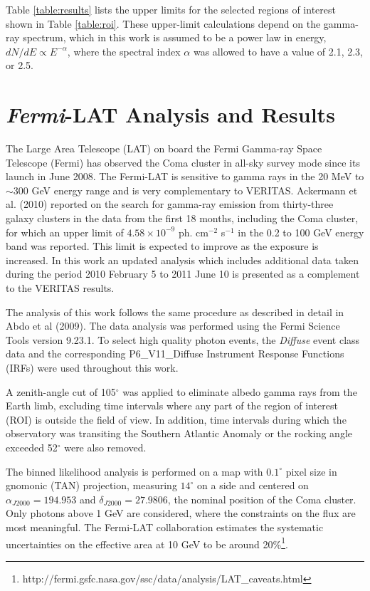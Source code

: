 \documentclass[12pt,manuscript]{aastex}
\def\Fermi{{\em Fermi}\xspace}
\begin{document}
Table \ref{table:results} lists the upper limits for the selected regions of interest shown in
Table \ref{table:roi}. These upper-limit calculations depend on the gamma-ray spectrum, which in
this work is assumed to be a power law in energy, $dN/dE\propto E^{-\alpha}$, where the spectral index
$\alpha$ was allowed to have a value of 2.1, 2.3, or 2.5.

%
%

\section{\Fermi-LAT Analysis and Results}
The Large Area Telescope (LAT) on board the Fermi Gamma-ray Space Telescope (Fermi) has observed
the Coma cluster in all-sky survey mode since its launch in June 2008. The Fermi-LAT is sensitive
to gamma rays in the 20 MeV to $\sim300$ GeV energy range and is very complementary to 
VERITAS. Ackermann et al. (2010) reported on the search for gamma-ray emission from
thirty-three galaxy clusters in the data from the first 18 months, including the Coma cluster, for
which an upper limit of $4.58\times10^{-9}$ ph. cm$^{-2}$ s$^{-1}$ in the 0.2 to 100 GeV energy band was reported. This limit is expected to improve as the exposure is increased. In this work an
updated analysis which includes additional data taken during the period 2010 February 5 to 2011 
June 10 is presented as a complement to the VERITAS results.

The analysis of this work follows the same procedure as described in detail in Abdo et al (2009).
The data analysis was performed using the Fermi Science Tools version 9.23.1. To select high
quality photon events, the \textit{Diffuse} event class data and the corresponding P6\_V11\_Diffuse
Instrument Response Functions (IRFs) were used throughout this work.

A zenith-angle cut of 105$^\circ$ was applied to eliminate albedo gamma rays from the Earth limb,
excluding time intervals where any part of the region of interest (ROI) is outside the field of
view. In addition, time intervals during which the observatory was transiting the Southern Atlantic Anomaly or the rocking angle exceeded 52$^\circ$ were also removed.

The binned likelihood analysis is performed on a map with $0.1^{\circ}$ pixel size in gnomonic (TAN)
projection, measuring $14^{\circ}$ on a side and centered on $\alpha_{J2000}=194.953$ and
$\delta_{J2000}=27.9806$, the nominal position of the Coma cluster. Only photons above 1 GeV are
considered, where the constraints on the flux are most meaningful. The Fermi-LAT collaboration
estimates the systematic uncertainties on the effective area at 10 GeV to be around
20\%\footnote{http://fermi.gsfc.nasa.gov/ssc/data/analysis/LAT\_caveats.html}.
\end{document}
